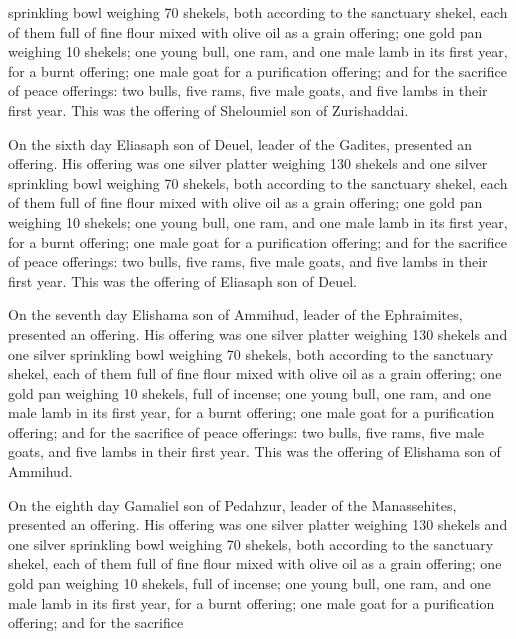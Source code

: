 {sprinkling bowl
weighing 70
shekels,
both according to the sanctuary
shekel,
each of them
full
of fine flour
mixed
with olive oil
as a grain offering;
one
gold
pan
weighing
10
shekels;
one
young
bull,
one ram,
and one
male lamb
in its first
year,
for a burnt offering;
one
male
goat
for a purification offering;
and for the sacrifice
of peace offerings: two
bulls,
five
rams,
five
male goats,
and five
lambs
in their first year.
This
was the offering
of Sheloumiel
son
of Zurishaddai.
\par }{\PP {}On
the sixth
day
Eliasaph
son
of Deuel,
leader
of the Gadites, presented an offering.
His offering
was one
silver
platter
weighing 130
shekels
and one
silver
sprinkling bowl
weighing 70
shekels,
both according to the sanctuary
shekel,
each of them
full
of fine flour
mixed
with olive oil
as a grain offering;
one
gold
pan
weighing
10
shekels;
one
young
bull,
one ram,
and one
male lamb
in its first
year,
for a burnt offering;
one
male
goat
for a purification offering;
and for the sacrifice
of peace offerings: two
bulls,
five
rams,
five
male goats,
and five
lambs
in their first year.
This
was the offering
of Eliasaph
son
of Deuel.
\par }{\PP {}On the seventh
day
Elishama
son
of Ammihud,
leader
of the Ephraimites, presented an offering.
His offering
was one
silver
platter
weighing 130
shekels
and one
silver
sprinkling bowl
weighing 70
shekels,
both according to the sanctuary
shekel,
each of them
full
of fine flour
mixed
with olive oil
as a grain offering;
one
gold
pan
weighing
10
shekels, full
of incense;
one
young
bull,
one ram,
and one
male lamb
in its first
year,
for a burnt offering;
one
male
goat
for a purification offering;
and for the sacrifice
of peace offerings: two
bulls,
five
rams,
five
male goats,
and five
lambs
in their first year.
This
was the offering
of Elishama
son
of Ammihud.
\par }{\PP {}On the eighth
day
Gamaliel
son
of Pedahzur,
leader
of the Manassehites, presented an offering.
His offering
was one
silver
platter
weighing 130
shekels
and one
silver
sprinkling bowl
weighing 70
shekels,
both according to the sanctuary
shekel,
each of them
full
of fine flour
mixed
with olive oil
as a grain offering;
one
gold
pan
weighing
10
shekels, full
of incense;
one
young
bull,
one ram,
and one
male lamb
in its first
year,
for a burnt offering;
one
male
goat
for a purification offering;
and for the sacrifice
}
